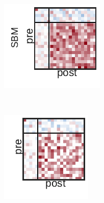 \begin{figure}[t!]
\begin{subfigure}[b]{1.10in}
  \end{subfigure}
  \\
  \vspace{-.1in}
  \begin{subfigure}[b]{1.25in}
    \centering
    \includegraphics[width=\textwidth]{figures/ch3/Dense-SBM.pdf}
  \end{subfigure}
  ~
  \hspace{-.1in}
  \begin{subfigure}[b]{1.10in}
    \centering
    \includegraphics[width=\textwidth]{figures/ch3/Bernoulli-SBM.pdf}

\end{subfigure}
\end{figure}
